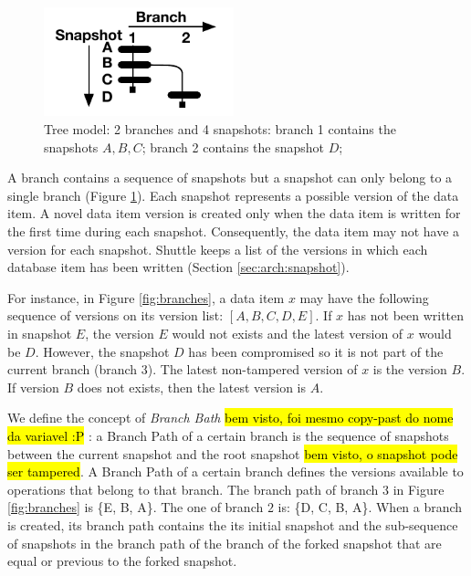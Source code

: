 \begin{figure}
\centering
\includegraphics[width=55mm]{images/branches_paper}
\caption[Tree model]{Tree model: 2 branches and 4 snapshots: branch 1 contains the snapshots $A, B, C$; branch 2 contains the snapshot $D$;}
\label{fig:branches_simple}
\end{figure}


A branch contains a sequence of snapshots but a snapshot can only belong to a single branch (Figure \ref{fig:branches_simple}). Each snapshot represents a possible version of the data item. A novel data item version is created only when the data item is written for the first time during each snapshot. Consequently, the data item may not have a version for each snapshot. Shuttle keeps a list of the versions in which each database item has been written (Section \ref{sec:arch:snapshot}).

For instance, in Figure \ref{fig:branches}, a data item $x$ may have the following sequence of versions on its version list: $[A,B,C,D,E]$. If $x$ has not been written in snapshot $E$, the version $E$ would not exists and the latest version of $x$ would be $D$. However, the snapshot $D$ has been compromised so it is not part of the current branch (branch 3). The latest non-tampered version of $x$ is the version $B$. If version $B$ does not exists, then the latest version is $A$.

We define the concept of \emph{Branch Bath} \hl{bem visto, foi mesmo copy-past do nome da variavel :P }:  a Branch Path of a certain branch is the sequence of snapshots between the current snapshot and the root snapshot \hl{bem visto, o snapshot pode ser tampered}. A Branch Path of a certain branch defines the versions available to operations that belong to that branch. The branch path of branch $3$ in Figure \ref{fig:branches} is \{E, B, A\}. The one of branch $2$ is: \{D, C, B, A\}. When a branch is created, its branch path contains the its initial snapshot and the sub-sequence of snapshots in the branch path of the branch of the forked snapshot that are equal or previous to the forked snapshot.


